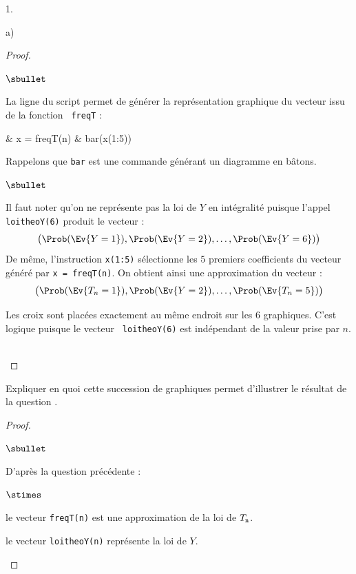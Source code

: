 \begin{noliste}{1.}
\begin{noliste}{a)}
\begin{proof}
\begin{noliste}{$\sbullet$}
      \item La ligne  du script permet de générer la
        représentation graphique du vecteur issu de la fonction {\tt
          freqT} :
        \begin{scilabC}{10}
          & x = freqT(n) \nl %
          & bar(x(1:5)) \nl %
        \end{scilabC}
        Rappelons que {\tt bar} est une commande générant un diagramme
        en bâtons.%
      \end{noliste}
      \begin{remark}%
        \begin{noliste}{$\sbullet$}
        \item Il faut noter qu'on ne représente pas la loi de $Y$ en
          intégralité puisque l'appel {\tt loitheoY(6)} produit le
          vecteur : 
          \[
          \big( \Prob(\Ev{Y=1}), \Prob(\Ev{Y=2}), \ldots, \Prob(\Ev{Y=
            6}) \big)
          \]
          De même, l'instruction {\tt x(1:5)} sélectionne les $5$
          premiers coefficients du vecteur généré par {\tt x =
            freqT(n)}. On obtient ainsi une approximation du vecteur :
          \[
          \big( \Prob(\Ev{T_n = 1}), \Prob(\Ev{Y=2}), \ldots,
          \Prob(\Ev{T_n= 5}) \big)
          \]
          {\tt }
        \item Les croix sont placées exactement au même endroit sur
          les $6$ graphiques. C'est logique puisque le vecteur {\tt
            loitheoY(6)} est indépendant de la valeur prise par $n$.
        \end{noliste}
      \end{remark}~\\[-1.4cm]
    \end{proof}
    
    
    \newpage


  \item Expliquer en quoi cette succession de graphiques permet
    d'illustrer le résultat de la question .
  
    \begin{proof}~
      \begin{noliste}{$\sbullet$}
      \item D'après la question précédente :
        \begin{noliste}{$\stimes$}
        \item le vecteur {\tt freqT(n)} est une approximation de la
          loi de $T_{\tt n}$.
        \item le vecteur {\tt loitheoY(n)} représente la loi de $Y$.
        \end{noliste}


\end{noliste}
\end{proof}
\end{noliste}
\end{noliste}

